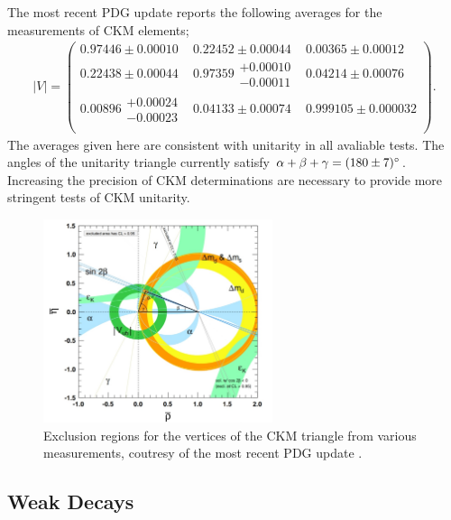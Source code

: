 The most recent PDG update \cite{PhysRevD.98.030001} reports the following averages for the measurements of CKM elements;
\begin{align}
  |V| = \begin{pmatrix}
    0.97446\pm 0.00010 & 0.22452\pm 0.00044 & 0.00365\pm 0.00012 \\
    0.22438\pm 0.00044 & 0.97359\substack{+0.00010\\-0.00011} & 0.04214\pm 0.00076 \\
    0.00896\substack{+0.00024\\-0.00023} & 0.04133\pm 0.00074 & 0.999105\pm 0.000032 \\
  \end{pmatrix}.
\end{align}
The averages given here are consistent with unitarity in all avaliable tests. %
The angles of the unitarity triangle currently satisfy $\alpha+\beta+\gamma = (180\pm 7)\degree$. Increasing the precision of CKM determinations are necessary to provide more stringent tests of CKM unitarity.

\begin{figure}
  \vspace{-10pt}
  \begin{center}
    \includegraphics[width=0.6\textwidth]{images/ckmpdg.jpg}
  \end{center}
  \vspace{-25pt}
  \caption{Exclusion regions for the vertices of the CKM triangle from various measurements, coutresy of the most recent PDG update \cite{PhysRevD.98.030001}.}
  \label{fig:ckmpdg}
\end{figure}

\subsection{Weak Decays}
\label{sec:weakdecays}

